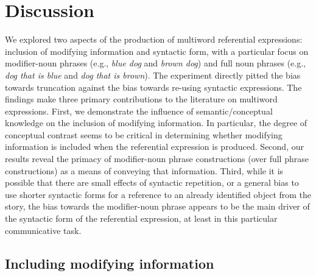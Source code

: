\documentclass[output=paper]{langsci/langscibook}
\begin{document}
\section{Discussion}

We explored two aspects of the production of multiword referential
expressions: inclusion of modifying information and syntactic form,
with a particular focus on modifier-noun phrases (e.g., \textit{blue
  dog} and \textit{brown dog}) and full noun phrases (e.g.,
\textit{dog that is blue} and \textit{dog that is brown}). The
experiment directly pitted the bias towards truncation against the
bias towards re-using syntactic expressions. The findings make three
primary contributions to the literature on multiword
expressions. First, we demonstrate the influence of
semantic/conceptual knowledge on the inclusion of modifying
information. In particular, the degree of conceptual contrast seems to
be critical in determining whether modifying information is included
when the referential expression is produced. Second, our results
reveal the primacy of modifier-noun phrase constructions (over full
phrase constructions) as a means of conveying that information. Third,
while it is possible that there are small effects of syntactic
repetition, or a general bias to use shorter syntactic forms for a
reference to an already identified object from the story, the bias
towards the modifier-noun phrase appears to be the main driver of the
syntactic form of the referential expression, at least in this
particular communicative task.

\subsection{Including modifying information}
\end{document}
